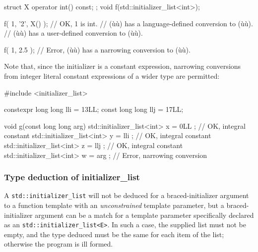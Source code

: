 \begin{emcppslisting}
struct X { operator int() const; };
void f(std::initializer_list<int>);

f({ 1, '2', X() });  // OK, 1 is int.
                     //     (ù{}ù) has a language-defined conversion to (ù{}ù).
                     //     (ù{}ù) has a user-defined conversion to (ù{}ù).

f({ 1, 2.5 });       // Error, (ù{}ù) has a narrowing conversion to (ù{}ù).
\end{emcppslisting}
    

\noindent Note that, since the initializer is a constant expression, narrowing
conversions from integer literal constant expressions of a wider type
are permitted:

\begin{emcppslisting}
#include <initializer_list>

constexpr long long lli = 13LL;
const     long long llj = 17LL;

void g(const long long arg)
{
    std::initializer_list<int> x = { 0LL };  // OK, integral constant
    std::initializer_list<int> y = { lli };  // OK, integral constant
    std::initializer_list<int> z = { llj };  // OK, integral constant
    std::initializer_list<int> w = { arg };  // Error, narrowing conversion
}
\end{emcppslisting}
    

\subsubsection[Type deduction of \lstinline!initializer_list!]{Type deduction of {\SubsubsecCode initializer\_list}}\label{type-deduction-of-initializer_list}

A \lstinline!std::initializer_list! will not be deduced for a
braced-initializer argument to a function template with an
\emph{unconstrained} template parameter, but a braced-initializer
argument can be a match for a template parameter specifically declared
as an \lstinline!std::initializer_list<E>!. In such a case, the supplied
list must not be empty, and the type deduced must be the same for each
item of the list; otherwise the program is ill formed.

